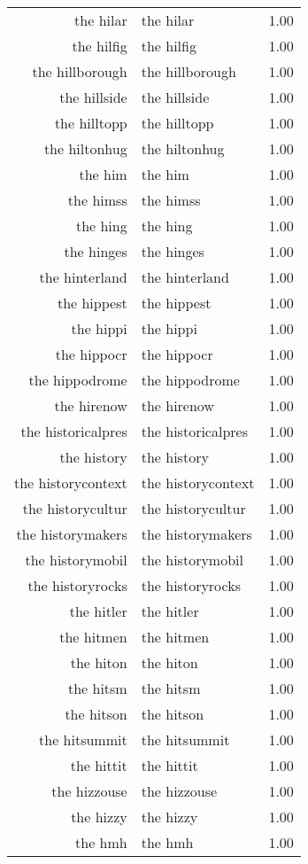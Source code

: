 \begin{table}[ht]
\begin{tabular}{rlr}
  the hilar & the hilar & 1.00 \\ 
  the hilfig & the hilfig & 1.00 \\ 
  the hillborough & the hillborough & 1.00 \\ 
  the hillside & the hillside & 1.00 \\ 
  the hilltopp & the hilltopp & 1.00 \\ 
  the hiltonhug & the hiltonhug & 1.00 \\ 
  the him & the him & 1.00 \\ 
  the himss & the himss & 1.00 \\ 
  the hing & the hing & 1.00 \\ 
  the hinges & the hinges & 1.00 \\ 
  the hinterland & the hinterland & 1.00 \\ 
  the hippest & the hippest & 1.00 \\ 
  the hippi & the hippi & 1.00 \\ 
  the hippocr & the hippocr & 1.00 \\ 
  the hippodrome & the hippodrome & 1.00 \\ 
  the hirenow & the hirenow & 1.00 \\ 
  the historicalpres & the historicalpres & 1.00 \\ 
  the history & the history & 1.00 \\ 
  the historycontext & the historycontext & 1.00 \\ 
  the historycultur & the historycultur & 1.00 \\ 
  the historymakers & the historymakers & 1.00 \\ 
  the historymobil & the historymobil & 1.00 \\ 
  the historyrocks & the historyrocks & 1.00 \\ 
  the hitler & the hitler & 1.00 \\ 
  the hitmen & the hitmen & 1.00 \\ 
  the hiton & the hiton & 1.00 \\ 
  the hitsm & the hitsm & 1.00 \\ 
  the hitson & the hitson & 1.00 \\ 
  the hitsummit & the hitsummit & 1.00 \\ 
  the hittit & the hittit & 1.00 \\ 
  the hizzouse & the hizzouse & 1.00 \\ 
  the hizzy & the hizzy & 1.00 \\ 
  the hmh & the hmh & 1.00 \\ 

\end{tabular}
\end{table}
